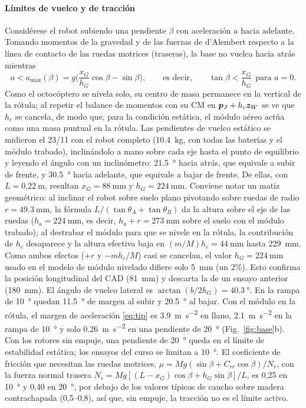\paragraph{Límites de vuelco y de tracción}
Considérese el robot subiendo una pendiente $\beta$ con aceleración $a$ hacia adelante. Tomando momentos de la gravedad y de las fuerzas de d'Alembert respecto a la línea de contacto de las ruedas motrices (traseras), la base no vuelca hacia atrás mientras
\begin{equation}
  a< a_{\max}(\beta)=g\Big(\frac{x_G}{h_G}\cos\beta-\sin\beta\Big),\qquad\text{es decir,}\qquad \tan\beta<\frac{x_G}{h_G}\ \ \text{para }a=0 .
  \label{eq:tip}
\end{equation}
Como el octocóptero se nivela solo, su centro de masa permanece en la vertical de la rótula; al repetir el balance de momentos con su CM en $\bm{p}_J+h_c\bm{z}_W$ se ve que $h_c$ se cancela, de modo que, para la condición estática, el módulo aéreo actúa como una masa puntual en la rótula. Las pendientes de vuelco estático se midieron el 23/11 con el robot completo (\SI{10.4}{\kilo\gram}, con todas las baterías y el módulo trabado), inclinándolo a mano sobre cada eje hasta el punto de equilibrio y leyendo el ángulo con un inclinómetro: \SI{21.5}{\degree} hacia atrás, que equivale a subir de frente, y \SI{30.5}{\degree} hacia adelante, que equivale a bajar de frente. De ellas, con $L=\SI{0.22}{\metre}$, resultan $x_G=\SI{88}{\milli\metre}$ y $h_G=\SI{224}{\milli\metre}$. Conviene notar un matiz geométrico: al inclinar el robot sobre suelo plano pivotando sobre ruedas de radio $r=\SI{49.3}{\milli\metre}$, la fórmula $L/(\tan\theta_A+\tan\theta_B)$ da la altura sobre el eje de las ruedas ($h_a=\SI{224}{\milli\metre}$, es decir, $h_a+r=\SI{273}{\milli\metre}$ sobre el suelo con el módulo trabado); al destrabar el módulo para que se nivele en la rótula, la contribución de $h_c$ desaparece y la altura efectiva baja en $(m/M)h_c=\SI{44}{\milli\metre}$ hasta \SI{229}{\milli\metre}. Como ambos efectos ($+r$ y $-mh_c/M$) casi se cancelan, el valor $h_G=\SI{224}{\milli\metre}$ usado en el modelo de módulo nivelado difiere solo \SI{5}{\milli\metre} (un 2\%). Esto confirma la posición longitudinal del CAD (\SI{81}{\milli\metre}) y descarta la de un ensayo anterior (\SI{180}{\milli\metre}). El ángulo de vuelco lateral es $\arctan(b/2h_G)=\SI{40.3}{\degree}$. En la rampa de \SI{10}{\degree} quedan \SI{11.5}{\degree} de margen al subir y \SI{20.5}{\degree} al bajar. Con el módulo en la rótula, el margen de aceleración \eqref{eq:tip} es \SI{3.9}{\metre\per\second\squared} en llano, \SI{2.1}{\metre\per\second\squared} en la rampa de \SI{10}{\degree} y solo \SI{0.26}{\metre\per\second\squared} en una pendiente de \SI{20}{\degree} (Fig.~\ref{fig:base}b). Con los rotores sin empuje, una pendiente de \SI{20}{\degree} queda en el límite de estabilidad estática; los ensayos del curso se limitan a \SI{10}{\degree}. El coeficiente de fricción que necesitan las ruedas motrices, $\mu=Mg(\sin\beta+C_{rr}\cos\beta)/N_r$, con la fuerza normal trasera $N_r=Mg[(L-x_G)\cos\beta+h_G\sin\beta]/L$, es 0,25 en \SI{10}{\degree} y 0,40 en \SI{20}{\degree}, por debajo de los valores típicos de caucho sobre madera contrachapada (0,5--0,8), así que, sin empuje, la tracción no es el límite activo.

